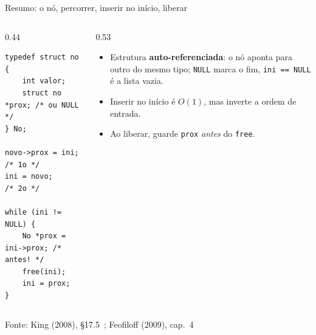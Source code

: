 \documentclass[aspectratio=169]{beamer}
\newcommand{\fonte}[1]{\vfill\hfill{\scriptsize\textcolor{UFSGray}{Fonte: #1}}}
\begin{document}
\begin{frame}[fragile]{Resumo: o nó, percorrer, inserir no início, liberar}
  \begin{columns}[T]
    \begin{column}{0.44\textwidth}
\begin{lstlisting}[style=tinyC]
typedef struct no {
    int valor;
    struct no *prox; /* ou NULL */
} No;

novo->prox = ini;  /* 1o */
ini = novo;        /* 2o */

while (ini != NULL) {
    No *prox = ini->prox; /* antes! */
    free(ini);
    ini = prox;
}
\end{lstlisting}
    \end{column}
    \begin{column}{0.53\textwidth}
      \begin{center}
      \end{center}
      \small
      \begin{itemize}
        \item Estrutura \textbf{auto-referenciada}: o nó aponta para outro
          do mesmo tipo; \texttt{NULL} marca o fim, \texttt{ini == NULL} é a
          lista vazia.
        \item Inserir no início é $O(1)$, mas inverte a ordem de entrada.
        \item Ao liberar, guarde \texttt{prox} \emph{antes} do \texttt{free}.
      \end{itemize}
    \end{column}
  \end{columns}
  \fonte{King (2008), §17.5~\cite{king2008c}; Feofiloff (2009), cap.~4~\cite{feofiloff2009algoritmos}}
\end{frame}
\end{document}
